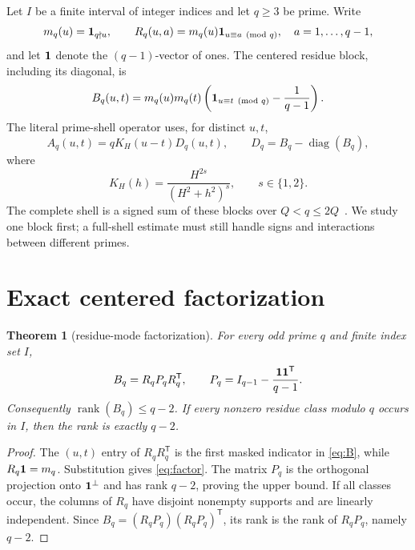 \documentclass[11pt]{article}
\newtheorem{theorem}{Theorem}
\begin{document}
Let $I$ be a finite interval of integer indices and let $q\geq3$ be prime.
Write
\begin{equation}
 m_q(u)={\bf1}_{q\nmid u},\qquad
 R_q(u,a)=m_q(u){\bf1}_{u\equiv a\pmod q},
 \quad a=1,\ldots,q-1,
 \label{eq:R}
\end{equation}
and let ${\bf1}$ denote the $(q-1)$-vector of ones.  The centered residue
block, including its diagonal, is
\begin{equation}
 B_q(u,t)=m_q(u)m_q(t)
 \left({\bf1}_{u\equiv t\pmod q}-\frac{1}{q-1}\right).
 \label{eq:B}
\end{equation}
The literal prime-shell operator uses, for distinct $u,t$,
\begin{equation}
 A_q(u,t)=qK_H(u-t)D_q(u,t),\qquad
 D_q=B_q-\operatorname{diag}(B_q),
 \label{eq:Aq}
\end{equation}
where
\begin{equation}
 K_H(h)=\frac{H^{2s}}{(H^2+h^2)^s},\qquad s\in\{1,2\}.
 \label{eq:K}
\end{equation}
The complete shell is a signed sum of these blocks over
$Q<q\leq2Q$~\cite{tpc268}.  We study one block first; a full-shell estimate
must still handle signs and interactions between different primes.

\section{Exact centered factorization}

\begin{theorem}[residue-mode factorization]
For every odd prime $q$ and finite index set $I$,
\begin{equation}
 B_q=R_qP_qR_q^{\mathsf T},\qquad
 P_q=I_{q-1}-\frac{{\bf1}{\bf1}^{\mathsf T}}{q-1}.
 \label{eq:factor}
\end{equation}
Consequently $\operatorname{rank}(B_q)\leq q-2$.  If every nonzero residue
class modulo $q$ occurs in $I$, then the rank is exactly $q-2$.
\end{theorem}

\begin{proof}
The $(u,t)$ entry of $R_qR_q^{\mathsf T}$ is the first masked indicator in
\eqref{eq:B}, while $R_q{\bf1}=m_q$.  Substitution gives \eqref{eq:factor}.
The matrix $P_q$ is the orthogonal projection onto
${\bf1}^{\perp}$ and has rank $q-2$, proving the upper bound.  If all classes
occur, the columns of $R_q$ have disjoint nonempty supports and are linearly
independent.  Since $B_q=(R_qP_q)(R_qP_q)^{\mathsf T}$, its rank is the rank of
$R_qP_q$, namely $q-2$.
\end{proof}
\end{document}

